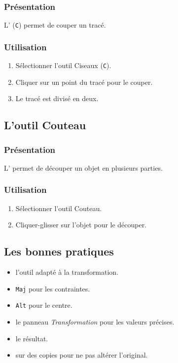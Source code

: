 \subsubsection{Présentation}

L' (\texttt{C}) permet de couper un tracé.

\subsubsection{Utilisation}

\begin{enumerate}
    \item Sélectionner l'outil Ciseaux (\texttt{C}).
    \item Cliquer sur un point du tracé pour le couper.
    \item Le tracé est divisé en deux.
\end{enumerate}

\subsection{L'outil Couteau}

\subsubsection{Présentation}

L' permet de découper un objet en plusieurs parties.

\subsubsection{Utilisation}

\begin{enumerate}
    \item Sélectionner l'outil Couteau.
    \item Cliquer-glisser sur l'objet pour le découper.
\end{enumerate}

\subsection{Les bonnes pratiques}

\begin{itemize}
    \item {} l'outil adapté à la transformation.
    \item {} \texttt{Maj} pour les contraintes.
    \item {} \texttt{Alt} pour le centre.
    \item {} le panneau \emph{Transformation} pour les valeurs précises.
    \item {} le résultat.
    \item {} sur des copies pour ne pas altérer l'original.
\end{itemize}


